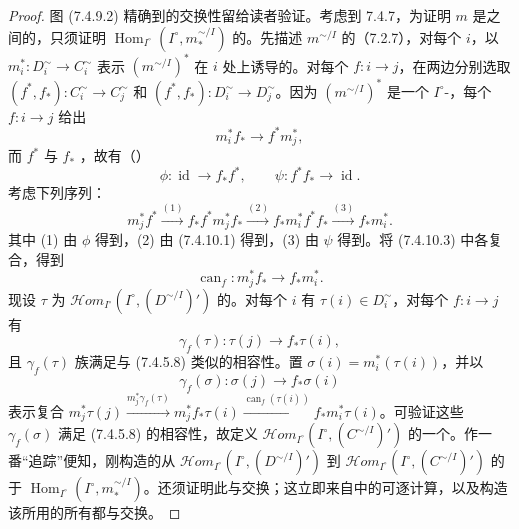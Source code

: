 \begin{proof}
图 (7.4.9.2) 精确到的交换性留给读者验证。考虑到 7.4.7，为证明 $m$ 是之间的，只须证明 $\operatorname{Hom}_{I^\circ}(I^\circ,m_*^{\sim/I})$ 的。先描述 $m^{\sim/I}$ 的（7.2.7），对每个 $i$，以 $m_i^*:D_i^\sim\to C_i^\sim$ 表示 $(m^{\sim/I})^*$ 在 $i$ 处上诱导的。对每个 $f:i\to j$，在两边分别选取 $(f^*,f_*):C_i^\sim\to C_j^\sim$ 和 $(f^*,f_*):D_i^\sim\to D_j^\sim$。因为 $(m^{\sim/I})^*$ 是一个 $I^\circ$-，每个 $f:i\to j$ 给出
\[m_i^*f_*\longrightarrow f^*m_j^*,\tag{7.4.10.1}\]
而 $f^*$ 与 $f_*$ ，故有（）
\[\phi:\operatorname{id}\longrightarrow f_*f^*,\qquad\psi:f^*f_*\longrightarrow\operatorname{id}.\tag{7.4.10.2}\]
考虑下列序列：
\[m_j^*f^*\xrightarrow{(1)}f_*f^*m_j^*f_*\xrightarrow{(2)}f_*m_i^*f^*f_*\xrightarrow{(3)}f_*m_i^*.\tag{7.4.10.3}\]
其中 (1) 由 $\phi$ 得到，(2) 由 (7.4.10.1) 得到，(3) 由 $\psi$ 得到。将 (7.4.10.3) 中各复合，得到
\[\operatorname{can}_f:m_j^*f_*\longrightarrow f_*m_i^*.\tag{7.4.10.4}\]
现设 $\tau$ 为 $\mathscr{H}\!om_{I^\circ}(I^\circ,(D^{\sim/I})')$ 的。对每个 $i$ 有 $\tau(i)\in D_i^\sim$，对每个 $f:i\to j$ 有
\[\gamma_f(\tau):\tau(j)\longrightarrow f_*\tau(i),\tag{7.4.10.5}\]
且 $\gamma_f(\tau)$ 族满足与 (7.4.5.8) 类似的相容性。置 $\sigma(i)=m_i^*(\tau(i))$，并以
\[\gamma_f(\sigma):\sigma(j)\longrightarrow f_*\sigma(i)\tag{7.4.10.6}\]
表示复合 $m_j^*\tau(j)\xrightarrow{m_j^*\gamma_f(\tau)}m_j^*f_*\tau(i)\xrightarrow{\operatorname{can}_f(\tau(i))}f_*m_i^*\tau(i)$。可验证这些 $\gamma_f(\sigma)$ 满足 (7.4.5.8) 的相容性，故定义 $\mathscr{H}\!om_{I^\circ}(I^\circ,(C^{\sim/I})')$ 的一个。作一番“追踪”便知，刚构造的从 $\mathscr{H}\!om_{I^\circ}(I^\circ,(D^{\sim/I})')$ 到 $\mathscr{H}\!om_{I^\circ}(I^\circ,(C^{\sim/I})')$ 的于 $\operatorname{Hom}_{I^\circ}(I^\circ,m_*^{\sim/I})$。还须证明此与交换；这立即来自中的可逐计算，以及构造该所用的所有都与交换。
\end{proof}
